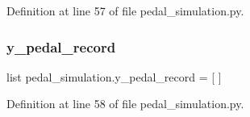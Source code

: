 Definition at line 57 of file pedal\+\_\+simulation.\+py.

\mbox{\label{namespacepedal__simulation_ad56ea447f391114ab2b382becbe2bc59}} 
\subsubsection{\texorpdfstring{y\_pedal\_record}{y\_pedal\_record}}
{\footnotesize\ttfamily list pedal\+\_\+simulation.\+y\+\_\+pedal\+\_\+record = \mbox{[} \mbox{]}}



Definition at line 58 of file pedal\+\_\+simulation.\+py.

